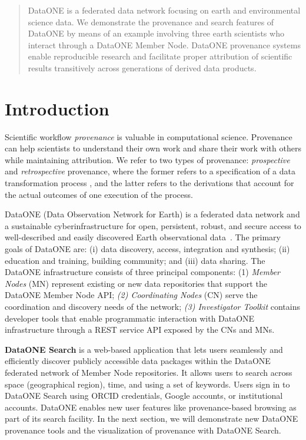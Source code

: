 \documentclass[a4paper]{llncs}
\newcommand{\mypara}[1]{\vspace{4pt}\noindent\textbf{#1}}
\begin{document}
\begin{abstract}
  DataONE is a federated data network focusing on earth and environmental science data. We demonstrate the provenance and search features of DataONE by means of an example involving three earth scientists who interact through a DataONE Member Node. DataONE provenance systems enable reproducible research and facilitate proper attribution of scientific results transitively across generations of derived data products.
 \end{abstract}




\section{Introduction}

Scientific workflow \emph{provenance} is valuable in computational science. Provenance can help scientists to understand their own work and share their work with others while maintaining attribution. We refer to two types of provenance: \emph{prospective} and \emph{retrospective} provenance, where the former refers to a specification of a data transformation process \cite{Freire2008}, and the latter refers to the derivations that account for the actual outcomes of one execution of the process.

DataONE (Data Observation Network for Earth) is a federated data network and a sustainable cyberinfrastructure for open, persistent, robust, and secure access to well-described and easily discovered Earth observational data~\cite{dataone}. The primary goals of DataONE are: (i) data discovery, access, integration and synthesis;  (ii) education and training, building community; and (iii) data sharing. The DataONE infrastructure consists of three principal components: (1) \emph{Member Nodes} (MN) represent existing or new data repositories that support the DataONE Member Node API; \emph{(2) Coordinating Nodes} (CN) serve the coordination and discovery needs of the network; \emph{(3) Investigator Toolkit} contains developer tools that enable programmatic interaction with DataONE infrastructure through a REST service API exposed by the CNs and MNs. 


\mypara{DataONE Search} is a web-based application that lets users seamlessly and efficiently discover publicly accessible data packages within the DataONE federated network of Member Node repositories. It allows users to search across space (geographical region), time, and using a set of keywords. Users sign in to DataONE Search using ORCID credentials, Google accounts, or institutional accounts. DataONE enables new user features like provenance-based browsing as part of its search facility. In the next section, we will demonstrate new DataONE provenance tools and the visualization of provenance with DataONE Search.
\end{document}
